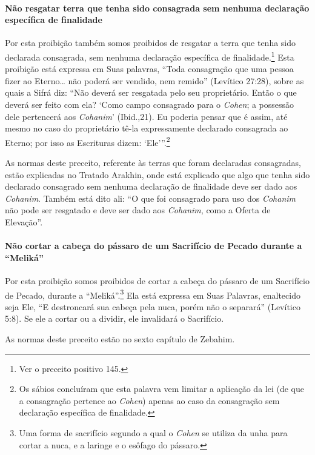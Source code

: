 \paragraph{Não resgatar terra que tenha sido consagrada sem nenhuma declaração
específica de finalidade}

Por esta proibição também somos proibidos de resgatar a terra que tenha
sido declarada consagrada, sem nenhuma declaração específica de
finalidade.\footnote{Ver o preceito positivo 145.} Esta proibição está expressa em Suas
palavras, ``Toda consagração que uma pessoa fizer ao Eterno\ldots{} não
poderá ser vendido, nem remido'' (Levítico 27:28), sobre as quais a
Sifrá diz: ``Não deverá ser resgatada pelo seu proprietário. Então o que
deverá ser feito com ela? `Como campo consagrado para o \textit{Cohen}; a
possessão dele pertencerá aos \textit{Cohanim}' (Ibid.,21). Eu poderia pensar
que é assim, até mesmo no caso do proprietário tê-la expressamente
declarado consagrada ao Eterno; por isso as Escrituras dizem:
`Ele'''.\footnote{Os sábios concluíram que esta palavra vem limitar a aplicação da
lei (de que a consagração pertence ao \textit{Cohen}) apenas ao caso da
consagração sem declaração específica de finalidade.}

As normas deste preceito, referente às terras que foram declaradas
consagradas, estão explicadas no Tratado Arakhin, onde está explicado
que algo que tenha sido declarado consagrado sem nenhuma declaração de
finalidade deve ser dado aos \textit{Cohanim}. Também está dito ali: ``O que
foi consagrado para uso dos \textit{Cohanim} não pode ser resgatado e deve ser
dado aos \textit{Cohanim}, como a Oferta de Elevação''.

\paragraph{Não cortar a cabeça do pássaro de um Sacrifício de Pecado durante a ``Meliká''}

Por esta proibição somos proibidos de cortar a cabeça do pássaro de um
Sacrifício de Pecado, durante a ``Meliká''.\footnote{Uma forma de sacrifício segundo a qual o \textit{Cohen} se utiliza da
unha para cortar a nuca, e a laringe e o esôfago do pássaro.} Ela
está expressa em Suas Palavras, enaltecido seja Ele, ``E destroncará sua
cabeça pela nuca, porém não o separará'' (Levítico 5:8). Se ele a cortar
ou a dividir, ele invalidará o Sacrifício.

As normas deste preceito estão no sexto capítulo de Zebahim.

